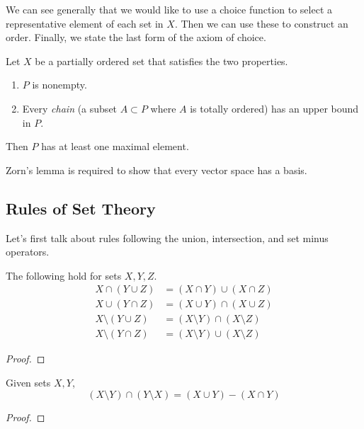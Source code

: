 \documentclass{article}
\begin{document}
    We can see generally that we would like to use a choice function to select a representative element of each set in $X$. Then we can use these to construct an order. Finally, we state the last form of the axiom of choice. 

    \begin{axiom}
      Let $X$ be a partially ordered set that satisfies the two properties. 
      \begin{enumerate}
        \item $P$ is nonempty. 
        \item Every \textit{chain} (a subset $A \subset P$ where $A$ is totally ordered) has an upper bound in $P$. 
      \end{enumerate}
      Then $P$ has at least one maximal element. 
    \end{axiom}

    Zorn's lemma is required to show that every vector space has a basis. 

  \subsection{Rules of Set Theory} 

    Let's first talk about rules following the union, intersection, and set minus operators. 

    \begin{theorem}
      The following hold for sets $X, Y, Z$. 
      \begin{align}
        X \cap (Y \cup Z) & = (X \cap Y) \cup (X \cap Z) \\  
        X \cup (Y \cap Z) & = (X \cup Y) \cap (X \cup Z) \\ 
        X \setminus (Y \cup Z) & = (X \setminus Y) \cap (X \setminus Z) \\
        X \setminus (Y \cap Z) & = (X \setminus Y) \cup (X \setminus Z)
      \end{align}
    \end{theorem}
    \begin{proof}
      
    \end{proof} 

    \begin{theorem}
      Given sets $X, Y$, 
      \begin{equation}
        (X \setminus Y) \cap (Y \setminus X) = (X \cup Y) - (X \cap Y)
      \end{equation}
    \end{theorem}
    \begin{proof}
      
    \end{proof} 
\end{document}
